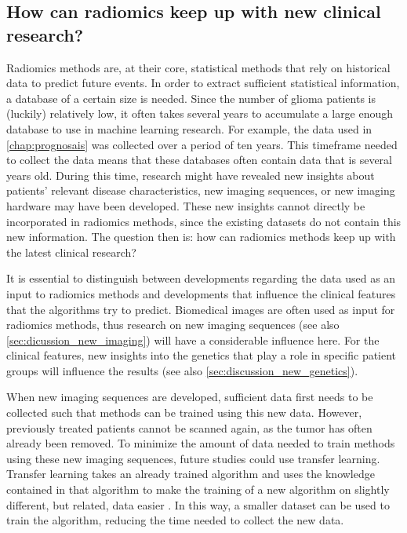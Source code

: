 \subsection{How can radiomics keep up with new clinical research?}\label{subsec:discussion_new_research}
Radiomics methods are, at their core, statistical methods that rely on historical data to predict future events.
In order to extract sufficient statistical information, a database of a certain size is needed.
Since the number of glioma patients is (luckily) relatively low, it often takes several years to accumulate a large enough database to use in machine learning research.
For example, the data used in \cref{chap:prognosais} was collected over a period of ten years.
This timeframe needed to collect the data means that these databases often contain data that is several years old.
During this time, research might have revealed new insights about patients' relevant disease characteristics, new imaging sequences, or new imaging hardware may have been developed.
These new insights cannot directly be incorporated in radiomics methods, since the existing datasets do not contain this new information.
The question then is: how can radiomics methods keep up with the latest clinical research?

It is essential to distinguish between developments regarding the data used as an input to radiomics methods and developments that influence the clinical features that the algorithms try to predict.
Biomedical images are often used as input for radiomics methods, thus research on new imaging sequences (see also \cref{sec:dicussion_new_imaging}) will have a considerable influence here.
For the clinical features, new insights into the genetics that play a role in specific patient groups will influence the results (see also \cref{sec:discussion_new_genetics}).

When new imaging sequences are developed, sufficient data first needs to be collected such that methods can be trained using this new data.
However, previously treated patients cannot be scanned again, as the \gls{tumor} has often already been removed.
To minimize the amount of data needed to train methods using these new imaging sequences, future studies could use transfer learning.
Transfer learning takes an already trained algorithm and uses the knowledge contained in that algorithm to make the training of a new algorithm on slightly different, but related, data easier \autocite{shin2016transfer}.
In this way, a smaller dataset can be used to train the algorithm, reducing the time needed to collect the new data.

